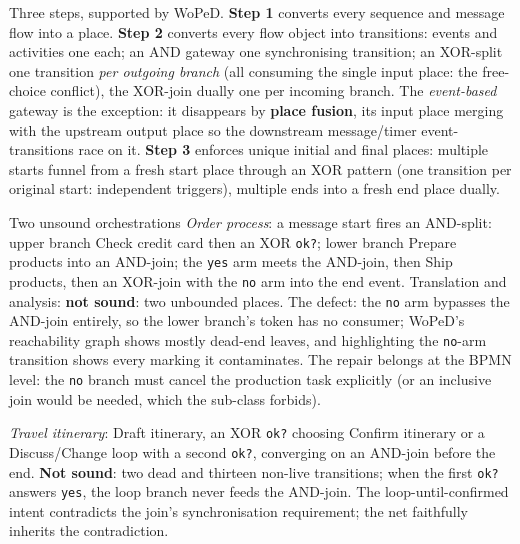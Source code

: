 Three steps, supported by WoPeD. \textbf{Step 1} converts every sequence and message flow into a place. \textbf{Step 2} converts every flow object into transitions: events and activities one each; an \textsf{AND} gateway one synchronising transition; an \textsf{XOR}-split one transition \emph{per outgoing branch} (all consuming the single input place: the free-choice conflict), the \textsf{XOR}-join dually one per incoming branch. The \emph{event-based} gateway is the exception: it disappears by \textbf{place fusion}, its input place merging with the upstream output place so the downstream message/timer event-transitions race on it. \textbf{Step 3} enforces unique initial and final places: multiple starts funnel from a fresh \textsf{start} place through an XOR pattern (one transition per original start: independent triggers), multiple ends into a fresh \textsf{end} place dually.

\begin{examplebox}{Two unsound orchestrations}
\emph{Order process}: a message start fires an AND-split: upper branch \textsf{Check credit card} then an XOR \texttt{ok?}; lower branch \textsf{Prepare products} into an AND-join; the \texttt{yes} arm meets the AND-join, then \textsf{Ship products}, then an XOR-join with the \texttt{no} arm into the end event. Translation and analysis: \textbf{not sound}: two unbounded places. The defect: the \texttt{no} arm bypasses the AND-join entirely, so the lower branch's token has no consumer; WoPeD's reachability graph shows mostly dead-end leaves, and highlighting the \texttt{no}-arm transition shows every marking it contaminates. The repair belongs at the BPMN level: the \texttt{no} branch must cancel the production task explicitly (or an inclusive join would be needed, which the sub-class forbids).
\par\smallskip
\emph{Travel itinerary}: \textsf{Draft itinerary}, an XOR \texttt{ok?} choosing \textsf{Confirm itinerary} or a \textsf{Discuss/Change} loop with a second \texttt{ok?}, converging on an AND-join before the end. \textbf{Not sound}: two dead and thirteen non-live transitions; when the first \texttt{ok?} answers \texttt{yes}, the loop branch never feeds the AND-join. The loop-until-confirmed intent contradicts the join's synchronisation requirement; the net faithfully inherits the contradiction.
\end{examplebox}

